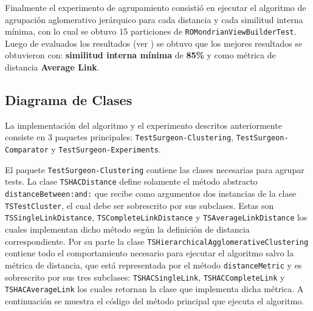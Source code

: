 
\par Finalmente el experimento de agrupamiento consistió en ejecutar el algoritmo de agrupación aglomerativo jerárquico para cada distancia y cada similitud interna mínima, con lo cual se obtuvo 15 particiones de {\tt ROMondrianViewBuilderTest}. Luego de evaluados los resultados (ver ) se obtuvo que los mejores resultados se obtuvieron con: \textbf{similitud interna mínima} de \textbf{85\%} y como métrica de distancia \textbf{Average Link}.

\clearpage
\subsection{Diagrama de Clases}

\par La implementación del algoritmo y el experimento descritos anteriormente consiste en 3 paquetes principales: {\tt TestSurgeon-Clustering},  {\tt TestSurgeon-Comparator} y {\tt TestSurgeon-Experiments}. 


\par El paquete {\tt TestSurgeon-Clustering} contiene las clases necesarias para agrupar tests. La clase {\tt TSHACDistance} define solamente el método abstracto {\tt distanceBetween:and:} que recibe como argumentos dos instancias de la clase {\tt TSTestCluster}, el cual debe ser sobrescrito por sus subclases. Estas son {\tt TSSingleLinkDistance}, {\tt TSCompleteLinkDistance} y {\tt TSAverageLinkDistance} los cuales implementan dicho método según la definición de distancia correspondiente. Por su parte la clase {\tt TSHierarchicalAgglomerativeClustering} contiene todo el comportamiento necesario para ejecutar el algoritmo salvo la métrica de distancia, que está representada por el método {\tt distanceMetric} y es sobrescrito por sus tres subclases: {\tt TSHACSingleLink}, {\tt TSHACCompleteLink} y {\tt TSHACAverageLink} los cuales retornan la clase que implementa dicha métrica. A continuación se muestra el código del método principal que ejecuta el algoritmo.

\vspace*{2cm}

